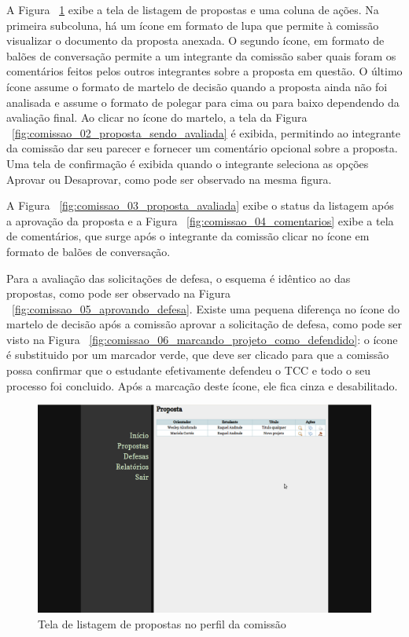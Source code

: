 A Figura ~\ref{fig:comissao_01_propostas} exibe a tela de listagem de propostas e uma coluna de
ações. Na primeira subcoluna, há um ícone em formato de lupa que permite à comissão visualizar
o documento da proposta anexada. O segundo ícone, em formato de balões de conversação permite
a um integrante da comissão saber quais foram os comentários feitos pelos outros integrantes sobre
a proposta em questão. O último ícone assume o formato de martelo de decisão quando a proposta
ainda não foi analisada e assume o formato de polegar para cima ou para baixo dependendo da 
avaliação final. Ao clicar no ícone do martelo, a tela da Figura ~\ref{fig:comissao_02_proposta_sendo_avaliada}
é exibida, permitindo ao integrante da comissão dar seu parecer e fornecer um comentário opcional
sobre a proposta. Uma tela de confirmação é exibida quando o integrante seleciona as opções Aprovar
ou Desaprovar, como pode ser observado na mesma figura.

A Figura ~\ref{fig:comissao_03_proposta_avaliada} exibe o status da listagem após a aprovação da
proposta e a Figura ~\ref{fig:comissao_04_comentarios} exibe a tela de comentários, que surge
após o integrante da comissão clicar no ícone em formato de balões de conversação. 

Para a avaliação das solicitações de defesa, o esquema é idêntico ao das propostas, como pode
ser observado na Figura ~\ref{fig:comissao_05_aprovando_defesa}. Existe uma pequena diferença
no ícone do martelo de decisão após a comissão aprovar a solicitação de defesa, como pode ser visto
na Figura ~\ref{fig:comissao_06_marcando_projeto_como_defendido}: o ícone é substituido por um
marcador verde, que deve ser clicado para que a comissão possa confirmar que o estudante
efetivamente defendeu o TCC e todo o seu processo foi concluido. Após a marcação deste ícone,
ele fica cinza e desabilitado.

\begin{figure}[htbp]
\centering
\includegraphics[width=1\textwidth]{fig/telas/processo/comissao_01_propostas.png}
\caption{Tela de listagem de propostas no perfil da comissão}
\label{fig:comissao_01_propostas}
\end{figure}

